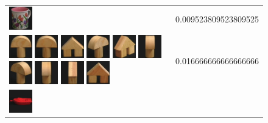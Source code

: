 \begin{figure}[!bp]
\begin{tabular}{m{11cm} | m{3cm} |}
\includegraphics[width=1cm]{coil/beeld-9.eps}
& {\scriptsize 0.009523809523809525}
\\
\includegraphics[width=1cm]{coil/beeld-0.eps}
\includegraphics[width=1cm]{coil/beeld-1.eps}
\includegraphics[width=1cm]{coil/beeld-42.eps}
\includegraphics[width=1cm]{coil/beeld-3.eps}
\includegraphics[width=1cm]{coil/beeld-45.eps}
\includegraphics[width=1cm]{coil/beeld-5.eps}
\includegraphics[width=1cm]{coil/beeld-4.eps}
\includegraphics[width=1cm]{coil/beeld-2.eps}
\includegraphics[width=1cm]{coil/beeld-47.eps}
\includegraphics[width=1cm]{coil/beeld-43.eps}
& {\scriptsize 0.016666666666666666}
\\
\includegraphics[width=1cm]{coil/beeld-18.eps}

\end{tabular}
\end{figure}

